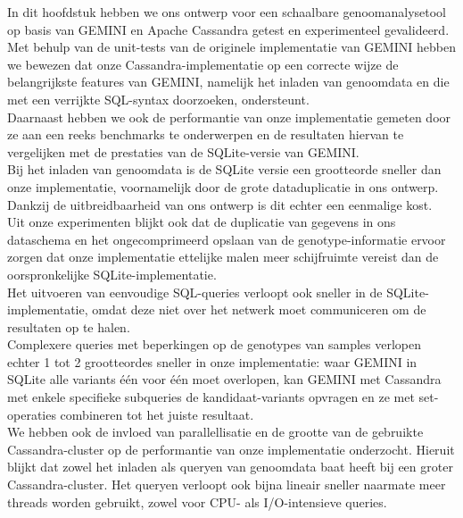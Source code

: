 In dit hoofdstuk hebben we ons ontwerp voor een schaalbare genoomanalysetool op basis van GEMINI en Apache Cassandra getest en experimenteel gevalideerd.\\
Met behulp van de unit-tests van de originele implementatie van GEMINI hebben we bewezen dat onze Cassandra-implementatie op een correcte wijze de belangrijkste features van GEMINI, namelijk het inladen van genoomdata en die met een verrijkte SQL-syntax doorzoeken, ondersteunt.\\
Daarnaast hebben we ook de performantie van onze implementatie gemeten door ze aan een reeks benchmarks te onderwerpen en de resultaten hiervan te vergelijken met de prestaties van de SQLite-versie van GEMINI. \\
Bij het inladen van genoomdata is de SQLite versie een grootteorde sneller dan onze implementatie, voornamelijk door de grote dataduplicatie in ons ontwerp. Dankzij de uitbreidbaarheid van ons ontwerp is dit echter een eenmalige kost.\\
Uit onze experimenten blijkt ook dat de duplicatie van gegevens in ons dataschema en het ongecomprimeerd opslaan van de genotype-informatie ervoor zorgen dat onze implementatie ettelijke malen meer schijfruimte vereist dan de oorspronkelijke SQLite-implementatie.\\
Het uitvoeren van eenvoudige SQL-queries verloopt ook sneller in de SQLite-implementatie, omdat deze niet over het netwerk moet communiceren om de resultaten op te halen.\\
Complexere queries met beperkingen op de genotypes van samples verlopen echter 1 tot 2 grootteordes sneller in onze implementatie: waar GEMINI in SQLite alle variants \'e\'en voor \'e\'en moet overlopen, kan GEMINI met Cassandra met enkele specifieke subqueries de kandidaat-variants opvragen en ze met set-operaties combineren tot het juiste resultaat.\\
We hebben ook de invloed van parallellisatie en de grootte van de gebruikte Cassandra-cluster op de performantie van onze implementatie onderzocht. Hieruit blijkt dat zowel het inladen als queryen van genoomdata baat heeft bij een groter Cassandra-cluster. Het queryen verloopt ook bijna lineair sneller naarmate meer threads worden gebruikt, zowel voor CPU- als I/O-intensieve queries.\\


